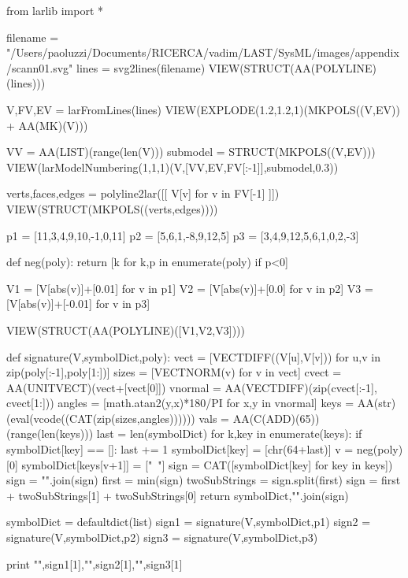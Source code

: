 from larlib import *

filename = "/Users/paoluzzi/Documents/RICERCA/vadim/LAST/SysML/images/appendix/scann01.svg"
lines = svg2lines(filename)
VIEW(STRUCT(AA(POLYLINE)(lines)))
    
V,FV,EV = larFromLines(lines)
VIEW(EXPLODE(1.2,1.2,1)(MKPOLS((V,EV)) + AA(MK)(V)))

VV = AA(LIST)(range(len(V)))
submodel = STRUCT(MKPOLS((V,EV)))
VIEW(larModelNumbering(1,1,1)(V,[VV,EV,FV[:-1]],submodel,0.3))

verts,faces,edges = polyline2lar([[ V[v] for v in FV[-1] ]])
VIEW(STRUCT(MKPOLS((verts,edges))))

p1 = [11,3,4,9,10,-1,0,11]
p2 = [5,6,1,-8,9,12,5]
p3 = [3,4,9,12,5,6,1,0,2,-3]

def neg(poly):
	return [k for k,p in enumerate(poly) if p<0]

V1 = [V[abs(v)]+[0.01] for v in p1]
V2 = [V[abs(v)]+[0.0] for v in p2]
V3 = [V[abs(v)]+[-0.01] for v in p3]

VIEW(STRUCT(AA(POLYLINE)([V1,V2,V3])))

def signature(V,symbolDict,poly):
	vect = [VECTDIFF((V[u],V[v])) for u,v in zip(poly[:-1],poly[1:])]
	sizes = [VECTNORM(v) for v in vect]
	cvect = AA(UNITVECT)(vect+[vect[0]])
	vnormal = AA(VECTDIFF)(zip(cvect[:-1], cvect[1:]))
	angles = [math.atan2(y,x)*180/PI for x,y in vnormal]
	keys = AA(str)(eval(vcode((CAT(zip(sizes,angles))))))
	vals = AA(C(ADD)(65))(range(len(keys)))
	last = len(symbolDict)
	for k,key in enumerate(keys): 
		if symbolDict[key] == []:
			last += 1
			symbolDict[key] = [chr(64+last)]
	v = neg(poly)[0]
	symbolDict[keys[v+1]] = ["~"]
	sign = CAT([symbolDict[key] for key in keys])
	sign = "".join(sign)
	first = min(sign)
	twoSubStrings = sign.split(first)
	sign = first + twoSubStrings[1] + twoSubStrings[0]
	return symbolDict,"".join(sign)

symbolDict = defaultdict(list)
sign1 = signature(V,symbolDict,p1)
sign2 = signature(V,symbolDict,p2)
sign3 = signature(V,symbolDict,p3)

print "\n",sign1[1],"\n",sign2[1],"\n",sign3[1]


